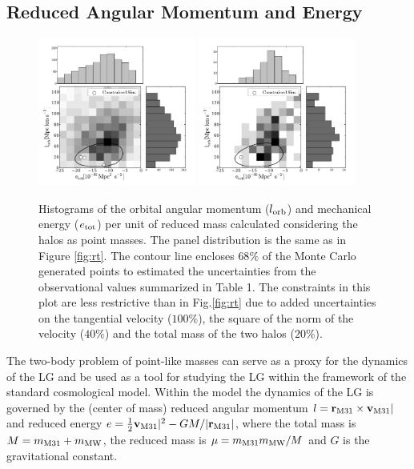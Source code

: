 \documentclass{emulateapj}
\begin{document}
\subsection{Reduced Angular Momentum and Energy}

\begin{figure}
\begin{center}
\includegraphics[keepaspectratio=true,width=0.46\textwidth]{./figures/test_EJ_BDM.pdf}
\includegraphics[keepaspectratio=true,width=0.46\textwidth]{./figures/test_EJ_BDM_narrow.pdf}
\caption{Histograms of the orbital angular momentum ($l_{\rm orb}$) and mechanical energy ($e_{\rm tot}$) per unit of reduced mass calculated considering the halos as point masses. The panel distribution is the same as in Figure \ref{fig:rt}. The contour line encloses $68\%$ of the Monte Carlo generated points to estimated the uncertainties from the observational values summarized in Table 1. The constraints in this plot are less restrictive than in Fig.\ref{fig:rt} due to added uncertainties on the tangential velocity ($100\%$), the square of the norm of the velocity ($40\%$) and the total mass of the two halos ($20\%$). }
\label{fig:EJ}
\end{center}
\end{figure}


The two-body problem of point-like masses can serve as a proxy for the dynamics of the LG and be used as a tool for  studying the LG within the framework of the standard cosmological model. Within the model the dynamics of the LG is governed by the (center of mass)  reduced angular momentum $l= {{\bf r}_{\rm M31}}\times{\bf v}_{\rm M31}|$ and reduced energy  $e=\frac{1}{2} {\bf v}_{\rm M31}|^2 - G M/|{\bf r}_{\rm M31}|$,  where the total mass is $M=m_{\rm M31}+m_{\rm MW}$, the reduced mass is $\mu=m_{\rm M31}m_{\rm MW}/M$ and $G$ is the gravitational constant. 
\end{document}
